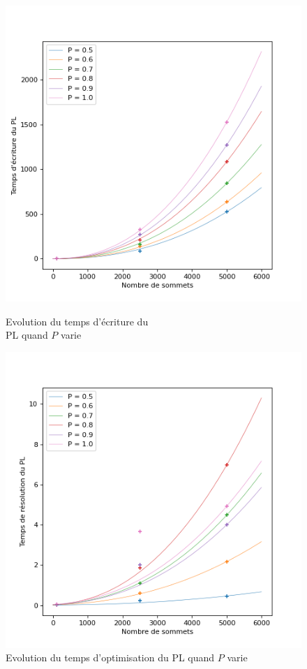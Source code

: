 \documentclass{article}
\begin{document}
\begin{figure}[h]
    \centering
    \begin{minipage}{.5\textwidth}
      \centering
      \includegraphics[scale=0.54]{lp_writing_changing_p.png}
      \caption{Evolution du temps d'écriture du\\PL quand $P$ varie}
      \label{fig:lp_w_var_p}
    \end{minipage}%
    \begin{minipage}{.5\textwidth}
      \centering
      \includegraphics[scale=0.54]{lp_solving_changing_p.png}
      \caption{Evolution du temps d'optimisation du PL quand $P$ varie}
      \label{fig:lp_s_var_p}
    \end{minipage}
\end{figure}
\end{document}
